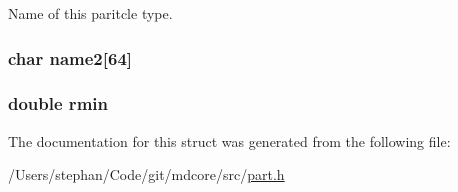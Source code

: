Name of this paritcle type. \hypertarget{structpart__type_a431d546b86bad034e7104d8a4994f19c}{
\subsubsection[{name2}]{\setlength{\rightskip}{0pt plus 5cm}char name2\mbox{[}64\mbox{]}}}\label{structpart__type_a431d546b86bad034e7104d8a4994f19c}
\hypertarget{structpart__type_a6b40e64084cc0e48b7a6be3c8d0c6ee6}{
\subsubsection[{rmin}]{\setlength{\rightskip}{0pt plus 5cm}double rmin}}\label{structpart__type_a6b40e64084cc0e48b7a6be3c8d0c6ee6}


The documentation for this struct was generated from the following file\-:\begin{DoxyCompactItemize}
\item 
/\-Users/stephan/\-Code/git/mdcore/src/\hyperlink{part_8h}{part.\-h}\end{DoxyCompactItemize}
